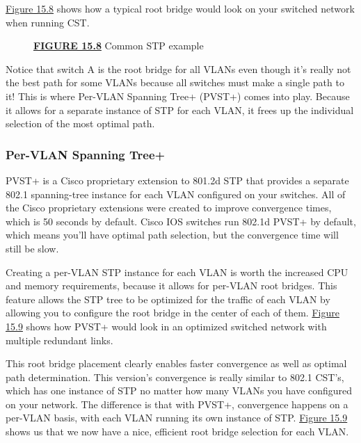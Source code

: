 \documentclass[b5paper,11pt]{memoir}
\begin{document}
\protect\hyperlink{c15.xhtmlux5cux23figure15-8}{Figure
15.8} shows how a typical root bridge would look on your switched
network when running CST.

\begin{figure}
\centering
\caption{{\protect\hyperlink{c15.xhtmlux5cux23figureanchor15-8}{\textbf{FIGURE
15.8}} Common STP example}}
\end{figure}

Notice that switch A is the root bridge for all VLANs even though it's
really not the best path for some VLANs because all switches must make a
single path to it! This is where Per-VLAN Spanning Tree+ (PVST+) comes
into play. Because it allows for a separate instance of STP for each
VLAN, it frees up the individual selection of the most optimal path.

\subsubsection[Per-VLAN Spanning
Tree+]{\texorpdfstring{\protect\hypertarget{c15.xhtmlux5cux23c15-sec-14}{}{}Per-VLAN
Spanning Tree+}{Per-VLAN Spanning Tree+}}

PVST+ is a Cisco proprietary extension to 801.2d STP that provides a
separate 802.1 spanning-tree instance for each VLAN configured on your
switches. All of the Cisco proprietary extensions were created to
improve convergence times, which is 50 seconds by default. Cisco IOS
switches run 802.1d PVST+ by default, which means you'll have optimal
path selection, but the convergence time will still be slow.

Creating a per-VLAN STP instance for each VLAN is worth the increased
CPU and memory requirements, because it allows for per-VLAN root
bridges. This feature allows the STP tree to be optimized for the
traffic of each VLAN by allowing you to configure the root bridge in the
center of each of them.
\protect\hyperlink{c15.xhtmlux5cux23figure15-9}{Figure 15.9} shows how
PVST+ would look in an optimized switched network with multiple
redundant links.

This root bridge placement clearly enables faster convergence as well as
optimal path determination. This version's convergence is really similar
to 802.1 CST's, which has one instance of STP no matter how many VLANs
you have configured on your network. The difference is that with PVST+,
convergence happens on a per-VLAN basis, with each VLAN running its own
instance of STP. \protect\hyperlink{c15.xhtmlux5cux23figure15-9}{Figure
15.9} shows us that we now have a nice, efficient root bridge selection
for each VLAN.
\end{document}

